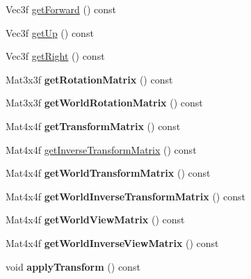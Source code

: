 \begin{DoxyCompactItemize}
\item 
Vec3f \hyperlink{class_transform_a5072a5bbe7c6f2655b15b84576af9b43}{getForward} () const 
\item 
Vec3f \hyperlink{class_transform_ac0946577a65bd758b1ac8871fe626b84}{getUp} () const 
\item 
Vec3f \hyperlink{class_transform_a046298794a6ef7496718c1508b506b8e}{getRight} () const 
\item 
\hypertarget{class_transform_ab767ab8fcc2788303d6dbc998b28f944}{
Mat3x3f {\bfseries getRotationMatrix} () const }
\label{class_transform_ab767ab8fcc2788303d6dbc998b28f944}

\item 
\hypertarget{class_transform_aed6f35d7acd26be90473ed42f8c23a89}{
Mat3x3f {\bfseries getWorldRotationMatrix} () const }
\label{class_transform_aed6f35d7acd26be90473ed42f8c23a89}

\item 
\hypertarget{class_transform_a7c990738fbadb5ad1001be23626bb2c8}{
Mat4x4f {\bfseries getTransformMatrix} () const }
\label{class_transform_a7c990738fbadb5ad1001be23626bb2c8}

\item 
Mat4x4f \hyperlink{class_transform_acdd5b97256cce34a3581fe027b2a331f}{getInverseTransformMatrix} () const 
\item 
\hypertarget{class_transform_a36af2906e513a2a7f94a73e90fcd86d2}{
Mat4x4f {\bfseries getWorldTransformMatrix} () const }
\label{class_transform_a36af2906e513a2a7f94a73e90fcd86d2}

\item 
\hypertarget{class_transform_aad951114815c5309cc15466cd7446a36}{
Mat4x4f {\bfseries getWorldInverseTransformMatrix} () const }
\label{class_transform_aad951114815c5309cc15466cd7446a36}

\item 
\hypertarget{class_transform_a12a6ce5dea580d99c46911968471d283}{
Mat4x4f {\bfseries getWorldViewMatrix} () const }
\label{class_transform_a12a6ce5dea580d99c46911968471d283}

\item 
\hypertarget{class_transform_a403bb8391d10095c7ce5af0d3405358f}{
Mat4x4f {\bfseries getWorldInverseViewMatrix} () const }
\label{class_transform_a403bb8391d10095c7ce5af0d3405358f}

\item 
\hypertarget{class_transform_ad82fc7d715d43b2708eb1c78e2c59167}{
void {\bfseries applyTransform} () const }
\label{class_transform_ad82fc7d715d43b2708eb1c78e2c59167}


\end{DoxyCompactItemize}
